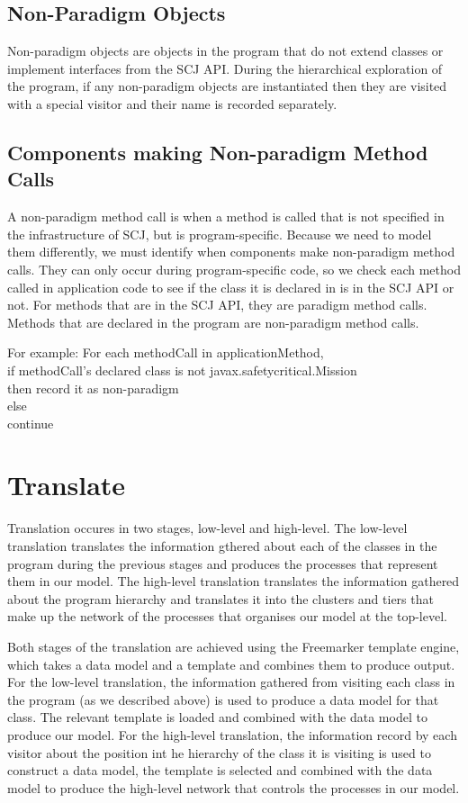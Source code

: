 \documentclass[10pt,a4paper]{article}
\newenvironment{ttSection}{\ttfamily}{\par}
\begin{document}
\subsection{Non-Paradigm Objects}

Non-paradigm objects are objects in the program that do not extend classes or implement interfaces from the SCJ API. During the hierarchical exploration of the program, if any non-paradigm objects are instantiated then they are visited with a special visitor and their name is recorded separately.


\subsection{Components making Non-paradigm Method Calls}

A non-paradigm method call is when a method is called that is not specified in the infrastructure of SCJ, but is program-specific. Because we need to model them differently, we must identify when components make non-paradigm method calls. They can only occur during program-specific code, so we check each method called in application code to see if the class it is declared in is in the SCJ API or not. For methods that are in the SCJ API, they are paradigm method calls. Methods that are declared in the program are non-paradigm method calls. 

For example:
\begin{ttSection}
For each methodCall in applicationMethod, \\
if methodCall's declared class is not javax.safetycritical.Mission \\
then record it as non-paradigm\\
else\\
continue
\end{ttSection}


\section{Translate}
\label{sec:translation}

Translation occures in two stages, low-level and high-level. The low-level translation translates the information gthered about each of the classes in the program during the previous stages and produces the processes that represent them in our model. The high-level translation translates the information gathered about the program hierarchy and translates it into the clusters and tiers that make up the network of the processes that organises our model at the top-level.

Both stages of the translation are achieved using the Freemarker template engine, which takes a data model and a template and combines them to produce output. For the low-level translation, the information gathered from visiting each class in the program (as we described above) is used to produce a data model for that class. The relevant template is loaded and combined with the data model to produce our model. For the high-level translation, the information record by each visitor about the position int he hierarchy of the class it is visiting is used to construct a data model, the template is selected and combined with the data model to produce the high-level network that controls the processes in our model.
\end{document}

